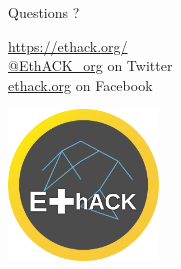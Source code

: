{
{
\centering
\begin{frame}
{Questions ?}

\href{https://ethack.org/}{https://ethack.org/} \\
\vspace{0.3cm}
\href{https://www.twitter.com/EthACK_org}{@EthACK\_org} on Twitter \\
\vspace{0.3cm}
\href{https://www.facebook.com/ethack.org}{ethack.org} on Facebook

\vspace{0.5cm}

\includegraphics[width=4cm]{../common/logo_537.png}
\end{frame}
}
}
